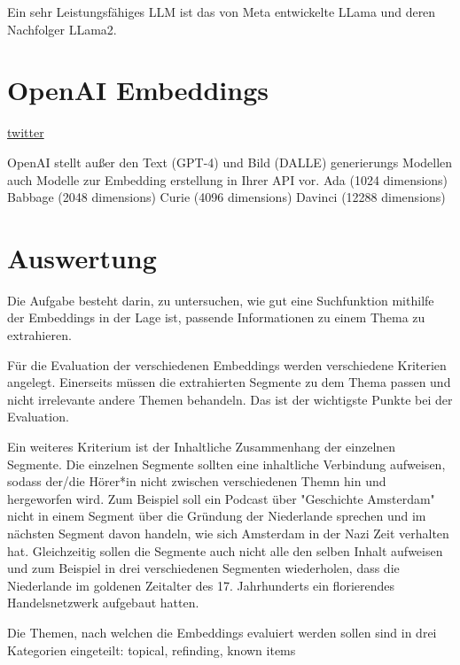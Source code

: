 Ein sehr Leistungsfähiges LLM ist das von Meta entwickelte LLama und deren Nachfolger LLama2. \cite{touvron2023}

\section{OpenAI Embeddings}

\href{https://twitter.com/Nils_Reimers/status/1487014195568775173}{twitter}



OpenAI stellt außer den Text (GPT-4) und Bild (DALLE) generierungs Modellen auch Modelle zur Embedding erstellung in Ihrer API vor.
Ada (1024 dimensions)
Babbage (2048 dimensions)
Curie (4096 dimensions)
Davinci (12288 dimensions)

\section{Auswertung}


Die Aufgabe besteht darin, zu untersuchen, wie gut eine Suchfunktion mithilfe der Embeddings in der Lage ist, passende Informationen zu einem Thema zu extrahieren.

Für die Evaluation der verschiedenen Embeddings werden verschiedene Kriterien angelegt.
Einerseits müssen die extrahierten Segmente zu dem Thema passen und nicht irrelevante andere Themen behandeln.
Das ist der wichtigste Punkte bei der Evaluation.

Ein weiteres Kriterium ist der Inhaltliche Zusammenhang der einzelnen Segmente.
Die einzelnen Segmente sollten eine inhaltliche Verbindung aufweisen, sodass der/die Hörer*in nicht zwischen verschiedenen Themn hin und hergeworfen wird.
Zum Beispiel soll ein Podcast über "Geschichte Amsterdam" nicht in einem Segment über die Gründung der Niederlande sprechen und im nächsten Segment davon handeln, wie sich Amsterdam in der Nazi Zeit verhalten hat.
Gleichzeitig sollen die Segmente auch nicht alle den selben Inhalt aufweisen und zum Beispiel in drei verschiedenen Segmenten wiederholen, dass die Niederlande im goldenen Zeitalter des 17. Jahrhunderts ein florierendes Handelsnetzwerk aufgebaut hatten.
 
Die Themen, nach welchen die Embeddings evaluiert werden sollen sind in drei Kategorien eingeteilt:
topical, refinding, known items \cite{jones2021}



